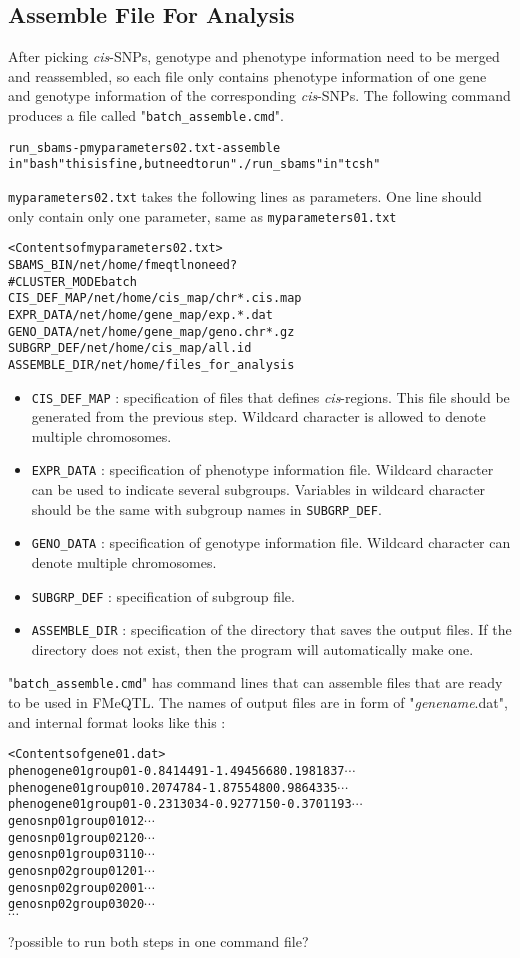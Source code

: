 \documentclass[11pt,fleqn]{article}
\begin{document}
\subsection{Assemble File For Analysis}
 After picking \textit{cis}-SNPs, genotype and phenotype information need to be merged and reassembled, so each file only contains phenotype information of one gene and genotype information of the corresponding \textit{cis}-SNPs.
 The following command produces a file called "{\tt batch\_assemble.cmd}".
 \begin{alltt}
 run_sbams -p myparameters02.txt -assemble
 {\color{red} in "bash" this is fine, but need to run "./run_sbams" in "tcsh"} 
 \end{alltt}
 {\tt myparameters02.txt} takes the following lines as parameters. One line should only contain only one parameter, same as {\tt myparameters01.txt}
 \begin{alltt}
 <Contents of myparameters02.txt>
 SBAMS_BIN /net/home/fmeqtl {\color{red} no need?}
 #CLUSTER_MODE batch
 CIS_DEF_MAP /net/home/cis_map/chr*.cis.map
 EXPR_DATA /net/home/gene_map/exp.*.dat
 GENO_DATA /net/home/gene_map/geno.chr*.gz
 SUBGRP_DEF /net/home/cis_map/all.id
 ASSEMBLE_DIR /net/home/files_for_analysis
 \end{alltt}
 \begin{itemize}
 	\item {\tt CIS\_DEF\_MAP} : specification of files that defines \textit{cis}-regions. This file should be generated from the previous step. Wildcard character is allowed to denote multiple chromosomes.
 	\item {\tt EXPR\_DATA} : specification of phenotype information file. Wildcard character can be used to indicate several subgroups. Variables in wildcard character should be the same with subgroup names in {\tt SUBGRP\_DEF}.
 	\item {\tt GENO\_DATA} : specification of genotype information file. Wildcard character can denote multiple chromosomes. 
 	\item {\tt SUBGRP\_DEF} : specification of subgroup file.
 	\item {\tt ASSEMBLE\_DIR} : specification of the directory that saves the output files. If the directory does not exist, then the program will automatically make one. 	
 \end{itemize}
 "{\tt batch\_assemble.cmd}" has command lines that can assemble files that are ready to be used in FMeQTL. The names of output files are in form of "\textit{genename}.dat", and internal format looks like this :
 \begin{alltt}
 <Contents of gene01.dat>
 pheno gene01 group01 -0.8414491 -1.4945668  0.1981837 \(\cdots\)
 pheno gene01 group01 0.2074784 -1.8755480  0.9864335 \(\cdots\)
 pheno gene01 group01 -0.2313034 -0.9277150 -0.3701193 \(\cdots\)
 geno snp01 group01 0 1 2 \(\cdots\)
 geno snp01 group02 1 2 0 \(\cdots\)
 geno snp01 group03 1 1 0 \(\cdots\)
 geno snp02 group01 2 0 1 \(\cdots\)
 geno snp02 group02 0 0 1 \(\cdots\)
 geno snp02 group03 0 2 0 \(\cdots\)
 \(\cdots\)
 \end{alltt}
 {\color{red} ?possible to run both steps in one command file?}
\newpage
\end{document}
